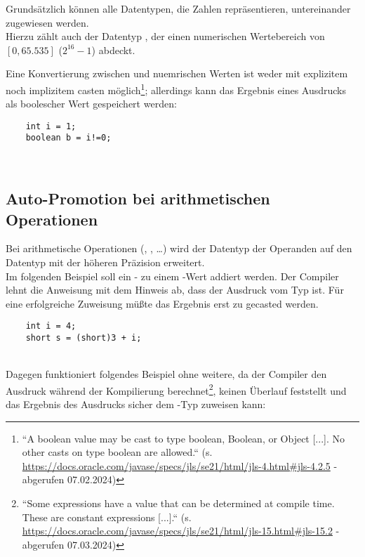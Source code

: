 \noindent
Grundsätzlich können alle Datentypen, die Zahlen repräsentieren, untereinander zugewiesen werden.\\
Hierzu zählt auch der Datentyp , der einen numerischen Wertebereich von $[0, 65.535]$ ($2^{16}-1$) abdeckt.

\noindent
Eine Konvertierung zwischen  und nuemrischen Werten ist weder mit explizitem noch implizitem casten möglich\footnote{
``A boolean value may be cast to type boolean, Boolean, or Object [...]. No other casts on type boolean are allowed.`` (s. \url{https://docs.oracle.com/javase/specs/jls/se21/html/jls-4.html#jls-4.2.5} - abgerufen 07.02.2024)
}; allerdings kann das Ergebnis eines Ausdrucks als boolescher Wert gespeichert werden:
\begin{verbatim}
    int i = 1;
    boolean b = i!=0;
\end{verbatim}\\

\subsection{Auto-Promotion bei arithmetischen Operationen}

Bei arithmetische Operationen (\code{+}, \code{-}, \ldots) wird der Datentyp der Operanden auf den Datentyp mit der höheren Präzision erweitert.\\

\noindent
Im folgenden Beispiel soll ein - zu einem -Wert addiert werden.
Der Compiler lehnt die Anweisung mit dem Hinweis ab, dass der Ausdruck  vom Typ  ist.
Für eine erfolgreiche Zuweisung müßte das Ergebnis erst zu  gecasted werden.

\begin{verbatim}
    int i = 4;
    short s = (short)3 + i;
\end{verbatim}\\

Dagegen funktioniert folgendes Beispiel ohne weitere, da der Compiler den Ausdruck während der Kompilierung berechnet\footnote{
    ``Some expressions have a value that can be determined at compile time. These are constant expressions [...].`` (s. \url{https://docs.oracle.com/javase/specs/jls/se21/html/jls-15.html#jls-15.2} - abgerufen 07.03.2024)
}, keinen Überlauf feststellt und das Ergebnis des Ausdrucks sicher dem -Typ zuweisen kann:

